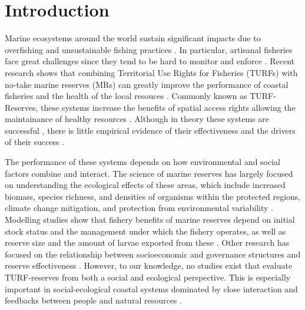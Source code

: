 \documentclass{frontiersSCNS}
\theoremstyle{definition}
\theoremstyle{definition}
\theoremstyle{definition}
\theoremstyle{remark}
\begin{document}
\clearpage

\section{Introduction}\label{introduction}

Marine ecosystems around the world sustain significant impacts due to
overfishing and unsustainable fishing practices
\citep{halpern_2008-dK,worm_2006-IB,pauly_2005-qV}. In particular,
artisanal fisheries face great challenges since they tend to be hard to
monitor and enforce \citep{costello_2012}. Recent research shows that
combining Territorial Use Rights for Fisheries (TURFs) with no-take
marine reserves (MRs) can greatly improve the performance of coastal
fisheries and the health of the local resouces
\citep{costello_2010-Ix,lester_2017}. Commonly known as TURF-Reserves,
these systems increase the benefits of spatial access rights allowing
the maintainance of healthy resources
\citep{afflerbach_2014-HP,lester_2017}. Although in theory these systems
are successful \citep{costello_2010-Ix,smallhornwest_2018}, there is
little empirical evidence of their effectiveness and the drivers of
their success \citep{afflerbach_2014-HP,lester_2017}.

The performance of these systems depends on how environmental and social
factors combine and interact. The science of marine reserves has largely
focused on understanding the ecological effects of these areas, which
include increased biomass, species richness, and densities of organisms
within the protected regions, climate change mitigation, and protection
from environmental variability
\citep{lester_2009-Ks,giakoumi_2017-V2,sala_2017-69,roberts_2017-J9,micheli_2012-EU}.
Modelling studies show that fishery benefits of marine reserves depend
on initial stock status and the management under which the fishery
operates, as well as reserve size and the amount of larvae exported from
these \citep{hilborn_2006,krueck_2017-J1,deleo_2015}. Other research has
focused on the relationship between socioeconomic and governance
structures and reserve effectiveness
\citep{halpern_2013,lpezangarita_2014,mascia_2017-m_}. However, to our
knowledge, no studies exist that evaluate TURF-reserves from both a
social and ecological perspective. This is especially important in
social-ecological coastal systems dominated by close interaction and
feedbacks between people and natural resources \citep{ostrom_2009-hg}.
\end{document}
